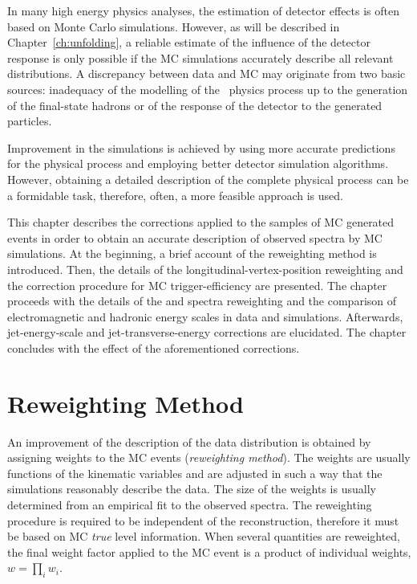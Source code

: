 In many high energy physics analyses, the estimation of detector effects is often based on Monte Carlo simulations. However, as will be described in Chapter~\ref{ch:unfolding}, a reliable estimate of the influence of the detector response is only possible if the MC simulations accurately describe all relevant distributions. %
 A discrepancy between data and MC may originate from two basic sources: inadequacy of the modelling of the \ep~physics process up to the generation of the final-state hadrons or of the response of the detector to the generated particles.
 
Improvement in the simulations is achieved by using more accurate predictions for the physical process and employing better detector simulation algorithms. However, obtaining a detailed description of the complete physical process can be a formidable task, therefore, often, a more feasible approach is used.

This chapter describes the corrections applied to the samples of MC generated events in order to obtain an accurate description of observed spectra by MC simulations. At the beginning, a brief account of the reweighting method is introduced. Then, the details of the longitudinal-vertex-position reweighting and the correction procedure for MC trigger-efficiency are presented. The chapter proceeds with the details of the \qsq and \etjetb spectra reweighting and the comparison of electromagnetic and hadronic energy scales in data and simulations. Afterwards, jet-energy-scale and jet-transverse-energy corrections are elucidated. The chapter concludes with the effect of the aforementioned corrections.

\section{Reweighting Method}

An improvement of the description of the data distribution is obtained by assigning weights to the MC events (\emph{reweighting method}). The weights are usually functions of the kinematic variables and are adjusted in such a way that the simulations reasonably describe the data. The size of the weights is usually determined from an empirical fit to the observed spectra. The reweighting procedure is required to be independent of the reconstruction, therefore it must be based on MC \emph{true} level information. When several quantities are reweighted, the final weight factor applied to the MC event is a product of individual weights, $w = \prod_i w_i$. 

